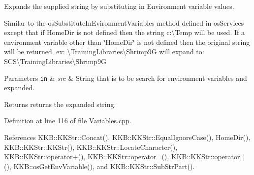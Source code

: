 Expands the supplied string by substituting in Environment variable values. 

Similar to the \textquotesingle{}os\+Substitute\+In\+Evironment\+Variables\textquotesingle{} method defined in \textquotesingle{}os\+Services\textquotesingle{} except that if \textquotesingle{}Home\+Dir\textquotesingle{} is not defined then the string \textquotesingle{}c\+:\textbackslash{}Temp\textquotesingle{} will be used. If a environment variable other than \char`\"{}\+Home\+Dir\char`\"{} is not defined then the original string will be returned. ex\+: \textquotesingle{}\textbackslash{}Training\+Libraries\textbackslash{}Shrimp9G\textquotesingle{} will expand to\+: \textquotesingle{}S\+CS\textbackslash{}Training\+Libraries\textbackslash{}Shrimp9G\textquotesingle{}


\begin{DoxyParams}[1]{Parameters}
\mbox{\tt in}  & {\em src} & String that is to be search for environment variables and expanded. \\
\hline
\end{DoxyParams}
\begin{DoxyReturn}{Returns}
returns the expanded string. 
\end{DoxyReturn}


Definition at line 116 of file Variables.\+cpp.



References K\+K\+B\+::\+K\+K\+Str\+::\+Concat(), K\+K\+B\+::\+K\+K\+Str\+::\+Equal\+Ignore\+Case(), Home\+Dir(), K\+K\+B\+::\+K\+K\+Str\+::\+K\+K\+Str(), K\+K\+B\+::\+K\+K\+Str\+::\+Locate\+Character(), K\+K\+B\+::\+K\+K\+Str\+::operator+(), K\+K\+B\+::\+K\+K\+Str\+::operator=(), K\+K\+B\+::\+K\+K\+Str\+::operator\mbox{[}$\,$\mbox{]}(), K\+K\+B\+::os\+Get\+Env\+Variable(), and K\+K\+B\+::\+K\+K\+Str\+::\+Sub\+Str\+Part().


